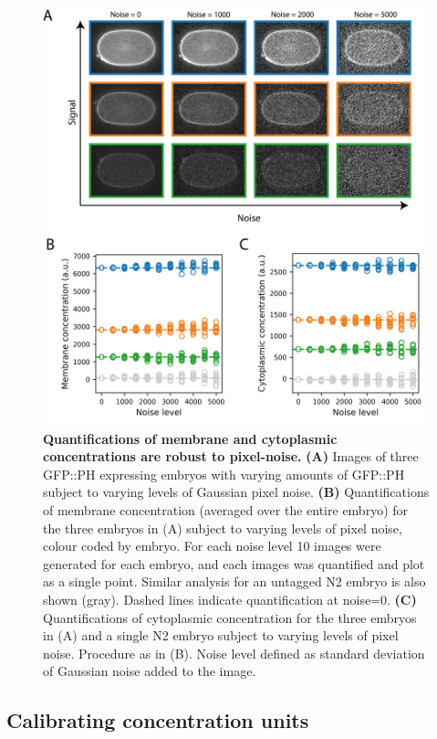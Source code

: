 \documentclass[12pt]{"report"}
\newcommand{\mycaption}[2]{\caption[#1]{\textbf{#1.} #2}}
\begin{document}
\begin{figure}
\includegraphics[scale=0.95]{memquant_benchmarking_noise}
\centering
\mycaption{Quantifications of membrane and cytoplasmic concentrations are robust to pixel-noise}{
\textbf{(A)} Images of three GFP::PH expressing embryos with varying amounts of GFP::PH subject to varying levels of Gaussian pixel noise.
\textbf{(B)} Quantifications of membrane concentration (averaged over the entire embryo) for the three embryos in (A) subject to varying levels of pixel noise, colour coded by embryo. For each noise level 10 images were generated for each embryo, and each images was quantified and plot as a single point. Similar analysis for an untagged N2 embryo is also shown (gray). Dashed lines indicate quantification at noise=0.
\textbf{(C)} Quantifications of cytoplasmic concentration for the three embryos in (A) and a single N2 embryo subject to varying levels of pixel noise. Procedure as in (B). Noise level defined as standard deviation of Gaussian noise added to the image. 
}
\label{fig:memquant_benchmarking_noise}
\end{figure}


\subsection{Calibrating concentration units}
\end{document}

